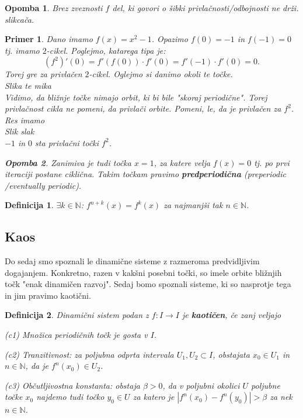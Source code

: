 \documentclass{article}
\newtheorem{definicija}{Definicija}
\newtheorem{opomba}{Opomba}
\newtheorem{primer}{Primer}
\newcommand{\N}{\mathbb{N}}
\begin{document}
\begin{opomba}
Brez zveznosti $f$ del, ki govori o šibki privlačnosti\slash odbojnosti ne drži.
slikcača.
\end{opomba}

\begin{primer}
Dano imamo $f(x) = x^2 - 1$. Opazimo $f(0) = -1$ in $f(-1) = 0$ tj. imamo $2$-cikel. Poglejmo, katarega tipa je:
$$
(f^2)'(0) = f'(f(0)) \cdot f'(0) = f'(-1)\cdot f'(0) = 0.
$$
Torej gre za privlačen $2$-cikel. Oglejmo si danimo okoli te točke.\\
Slika te mika\\ 
Vidimo, da bližnje točke nimajo orbit, ki bi bile "skoraj periodične". Torej privlačnost cikla ne pomeni, da privlači orbite. Pomeni, le, da je privlačen za $f^2$. Res imamo\\
Slik slak \\ 
$-1$ in $0$ sta privlačni točki $f^2$.

\begin{opomba}
Zanimiva je tudi točka $x = 1$, za katere velja $f(x) = 0$ tj. po prvi iteraciji postane ciklična. Takim točkam pravimo \textbf{predperiodična} (preperiodic \slash eventually periodic).
\end{opomba}
\end{primer}

\begin{definicija}
$\exists k\in \N$: $f^{n+k}(x) = f^k(x)$ za  najmanjši tak $n\in \N$.
\end{definicija}

\subsection{Kaos}
Do sedaj smo spoznali le dinamične sisteme z razmeroma predvidljivim dogajanjem. Konkretno, razen v kakšni posebni točki, so imele orbite bližnjih točk "enak dinamičen razvoj". Sedaj bomo spoznali sisteme, ki so nasprotje tega in jim pravimo kaotični. 

\begin{definicija}
Dinamični sistem podan z $f:I \rightarrow I$ je \textbf{kaotičen}, če zanj veljajo
\item[(c1)] Množica periodičnih točk je gosta v $I$.
\item[(c2)] Tranzitivnost: za poljubna odprta intervala $U_1, U_2 \subset I$, obstajata $x_0\in U_1$ in $n\in \N$, da je $f^n(x_0) \in U_2$.
\item[(c3)] Občutljivostna konstanta: obstaja $\beta > 0$, da v poljubni okolici $U$ poljubne točke $x_0$ najdemo tudi točko $y_0 \in U$ za katero je $|f^n(x_0) - f^n(y_0)| > \beta$ za nek $n\in \N$.
\end{definicija}
\end{document}
